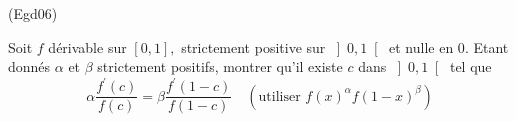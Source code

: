 \begin{tiny}(Egd06)\end{tiny}
Soit $f$ d{\'e}rivable sur $\left[ 0,1\right] ,$ strictement positive
sur $\left] 0,1\right[ $ et nulle en 0$.$ Etant donn{\'e}s $\alpha $ et $%
\beta $ strictement positifs, montrer qu'il existe $c$ dans
$\left] 0,1\right[ $ tel que
\[
\alpha \frac{f^{\prime }(c)}{f(c)}=\beta \frac{f^{\prime }(1-c)}{f(1-c)}%
\quad (\text{utiliser }f(x)^{\alpha }f(1-x)^{\beta })
\]